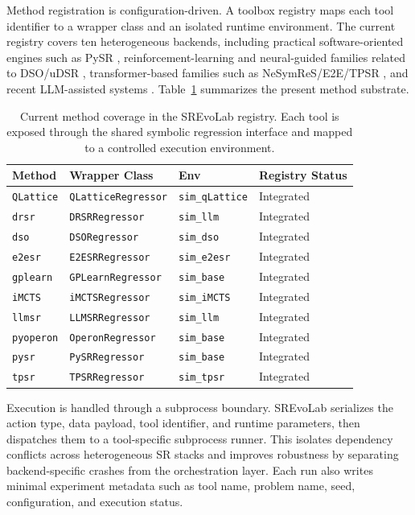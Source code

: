Method registration is configuration-driven. A toolbox registry maps each tool identifier to a wrapper class and an isolated runtime environment. The current registry covers ten heterogeneous backends, including practical software-oriented engines such as PySR \citep{cranmer2023pysr}, reinforcement-learning and neural-guided families related to DSO/uDSR \citep{petersen2021deep,mundhenk2021seeding,landajuela2022udsr}, transformer-based families such as NeSymReS/E2E/TPSR \citep{biggio2021nsr,kamienny2022end,tpsr2023}, and recent LLM-assisted systems \citep{shojaee2024llm,wang2025drsr}. Table~\ref{tab:method-coverage} summarizes the present method substrate.

\begin{table}[t]
\centering
\scriptsize
\begin{tabular}{llll}
\toprule
Method & Wrapper Class & Env & Registry Status \\
\midrule
\texttt{QLattice} & \texttt{QLatticeRegressor} & \texttt{sim\_qLattice} & Integrated \\
\texttt{drsr} & \texttt{DRSRRegressor} & \texttt{sim\_llm} & Integrated \\
\texttt{dso} & \texttt{DSORegressor} & \texttt{sim\_dso} & Integrated \\
\texttt{e2esr} & \texttt{E2ESRRegressor} & \texttt{sim\_e2esr} & Integrated \\
\texttt{gplearn} & \texttt{GPLearnRegressor} & \texttt{sim\_base} & Integrated \\
\texttt{iMCTS} & \texttt{iMCTSRegressor} & \texttt{sim\_iMCTS} & Integrated \\
\texttt{llmsr} & \texttt{LLMSRRegressor} & \texttt{sim\_llm} & Integrated \\
\texttt{pyoperon} & \texttt{OperonRegressor} & \texttt{sim\_base} & Integrated \\
\texttt{pysr} & \texttt{PySRRegressor} & \texttt{sim\_base} & Integrated \\
\texttt{tpsr} & \texttt{TPSRRegressor} & \texttt{sim\_tpsr} & Integrated \\
\bottomrule
\end{tabular}
\caption{Current method coverage in the SREvoLab registry. Each tool is exposed through the shared symbolic regression interface and mapped to a controlled execution environment.}
\label{tab:method-coverage}
\end{table}

Execution is handled through a subprocess boundary. SREvoLab serializes the action type, data payload, tool identifier, and runtime parameters, then dispatches them to a tool-specific subprocess runner. This isolates dependency conflicts across heterogeneous SR stacks and improves robustness by separating backend-specific crashes from the orchestration layer. Each run also writes minimal experiment metadata such as tool name, problem name, seed, configuration, and execution status.

